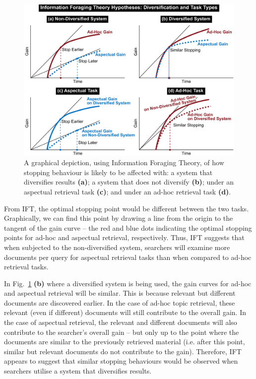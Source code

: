 \begin{figure}[t!]
\begin{center}
        \includegraphics[width=\textwidth]{figures/ift-non-div.pdf}
        \vspace{-2mm}
    \caption{A graphical depiction, using Information Foraging Theory, of how stopping behaviour is likely to be affected with: a system that diversifies results \textbf{(a)}; a system that does not diversify \textbf{(b)}; under an aspectual retrieval task \textbf{(c)}; and under an ad-hoc retrieval task \textbf{(d)}.} \label{fig_ift_patches}    
    \vspace{-6mm}
\end{center}
\end{figure}


From IFT, the optimal stopping point would be different between the two tasks. Graphically, we can find this point by drawing a line from the origin to the tangent of the gain curve -- the red and blue dots indicating the optimal stopping points for ad-hoc and aspectual retrieval, respectively. Thus, IFT suggests that when subjected to the non-diversified system, searchers will examine more documents per query for aspectual retrieval tasks than when compared to ad-hoc retrieval tasks.

In Fig.~\ref{fig_ift_patches} \textbf{(b)} where a diversified system is being used, the gain curves for ad-hoc and aspectual retrieval will be similar. This is because relevant but different documents are discovered earlier. In the case of ad-hoc topic retrieval, these relevant (even if different) documents will still contribute to the overall gain. In the case of aspectual retrieval, the relevant and different documents will also contribute to the searcher's overall gain -- but only up to the point where the documents are similar to the previously retrieved material (i.e. after this point, similar but relevant documents do not contribute to the gain). Therefore, IFT appears to suggest that similar stopping behaviours would be observed when searchers utilise a system that diversifies results.

